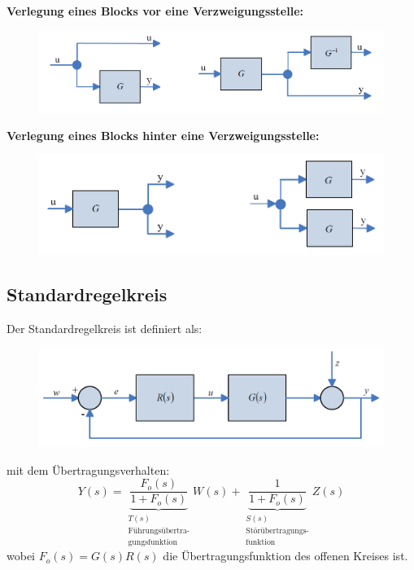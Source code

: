 \documentclass[10pt,a4paper]{article}
\begin{document}
\textbf{Verlegung eines Blocks vor eine Verzweigungsstelle:}
\begin{figure}[H]
	\includegraphics[width = \columnwidth]{imgs/verlegung_block_vor_verzweigung.png}
\end{figure}

\textbf{Verlegung eines Blocks hinter eine Verzweigungsstelle:}
\begin{figure}[H]
	\includegraphics[width = \columnwidth]{imgs/verlegung_block_hinter_verzweigung.png}
\end{figure}

\subsection{Standardregelkreis}

Der Standardregelkreis ist definiert als:
\begin{figure}[H]
	\includegraphics[width = \columnwidth]{imgs/standardregelkreis_2.png}
\end{figure}
mit dem Übertragungsverhalten:
$$
	Y(s) =\underbrace{ \frac{F_o(s)}{1 + F_o(s)}}_{\substack{T(s) \\ \text{Führungsübertra-} \\ \text{gungsfunktion}}} W(s) + \underbrace{\frac{1}{1 + F_o(s)}}_{\substack{S(s) \\ \text{Störübertragungs-} \\ \text{funktion}}} Z(s)
$$
wobei $F_o(s) = G(s)R(s)$ die Übertragungsfunktion des offenen Kreises ist.
\end{document}
